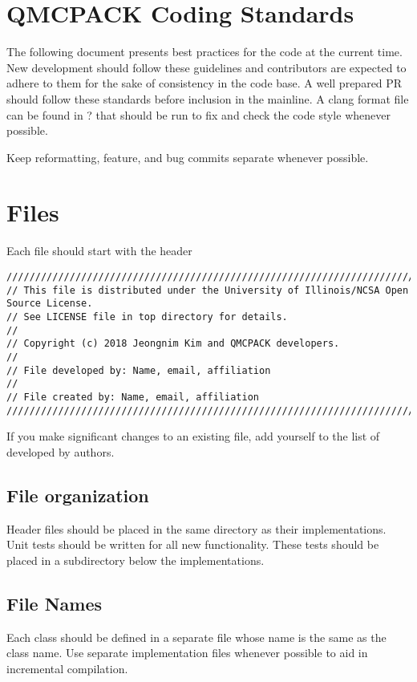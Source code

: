 \section{QMCPACK Coding Standards}

The following document presents best practices for the code at the current time. New development should follow these guidelines and contributors are expected to adhere to them for the sake of consistency in the code base. A well prepared PR should follow these standards before inclusion in the mainline. A clang format file can be found in ? that should be run to fix and check the code style whenever possible.

Keep reformatting, feature, and bug commits separate whenever possible.  


\section{Files}
Each file should start with the header
\lstset{language=C++,style=C++}
\begin{lstlisting}
//////////////////////////////////////////////////////////////////////////////////////
// This file is distributed under the University of Illinois/NCSA Open Source License.
// See LICENSE file in top directory for details.
//
// Copyright (c) 2018 Jeongnim Kim and QMCPACK developers.
//
// File developed by: Name, email, affiliation
//
// File created by: Name, email, affiliation
//////////////////////////////////////////////////////////////////////////////////////
\end{lstlisting}
If you make significant changes to an existing file, add yourself to the list of developed by authors.

\subsection{File organization}
Header files should be placed in the same directory as their implementations. 
Unit tests should be written for all new functionality. These tests should be placed in a  subdirectory below the implementations.

\subsection{File Names}
Each class should be defined in a separate file whose name is the same as the class name. Use separate  implementation files whenever possible to aid in incremental compilation. 

